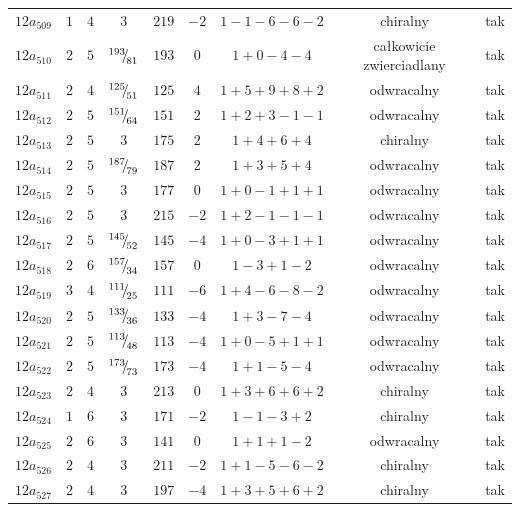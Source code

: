 \begin{longtable}{ccccccccc}
$12a_{509}$ & $1$ & $4$ & $3$ & $219$ & $-2$ & $1-1-6-6-2$ & chiralny & tak \\
$12a_{510}$ & $2$ & $5$ & ${}^{193}{\mskip -5mu/\mskip -3mu}_{81}$ & $193$ & $0$ & $1+0-4-4$ & całkowicie zwierciadlany & tak \\
$12a_{511}$ & $2$ & $4$ & ${}^{125}{\mskip -5mu/\mskip -3mu}_{51}$ & $125$ & $4$ & $1+5+9+8+2$ & odwracalny & tak \\
$12a_{512}$ & $2$ & $5$ & ${}^{151}{\mskip -5mu/\mskip -3mu}_{64}$ & $151$ & $2$ & $1+2+3-1-1$ & odwracalny & tak \\
$12a_{513}$ & $2$ & $5$ & $3$ & $175$ & $2$ & $1+4+6+4$ & chiralny & tak \\
$12a_{514}$ & $2$ & $5$ & ${}^{187}{\mskip -5mu/\mskip -3mu}_{79}$ & $187$ & $2$ & $1+3+5+4$ & odwracalny & tak \\
$12a_{515}$ & $2$ & $5$ & $3$ & $177$ & $0$ & $1+0-1+1+1$ & odwracalny & tak \\
$12a_{516}$ & $2$ & $5$ & $3$ & $215$ & $-2$ & $1+2-1-1-1$ & odwracalny & tak \\
$12a_{517}$ & $2$ & $5$ & ${}^{145}{\mskip -5mu/\mskip -3mu}_{52}$ & $145$ & $-4$ & $1+0-3+1+1$ & odwracalny & tak \\
$12a_{518}$ & $2$ & $6$ & ${}^{157}{\mskip -5mu/\mskip -3mu}_{34}$ & $157$ & $0$ & $1-3+1-2$ & odwracalny & tak \\
$12a_{519}$ & $3$ & $4$ & ${}^{111}{\mskip -5mu/\mskip -3mu}_{25}$ & $111$ & $-6$ & $1+4-6-8-2$ & odwracalny & tak \\
$12a_{520}$ & $2$ & $5$ & ${}^{133}{\mskip -5mu/\mskip -3mu}_{36}$ & $133$ & $-4$ & $1+3-7-4$ & odwracalny & tak \\
$12a_{521}$ & $2$ & $5$ & ${}^{113}{\mskip -5mu/\mskip -3mu}_{48}$ & $113$ & $-4$ & $1+0-5+1+1$ & odwracalny & tak \\
$12a_{522}$ & $2$ & $5$ & ${}^{173}{\mskip -5mu/\mskip -3mu}_{73}$ & $173$ & $-4$ & $1+1-5-4$ & odwracalny & tak \\
$12a_{523}$ & $2$ & $4$ & $3$ & $213$ & $0$ & $1+3+6+6+2$ & chiralny & tak \\
$12a_{524}$ & $1$ & $6$ & $3$ & $171$ & $-2$ & $1-1-3+2$ & chiralny & tak \\
$12a_{525}$ & $2$ & $6$ & $3$ & $141$ & $0$ & $1+1+1-2$ & odwracalny & tak \\
$12a_{526}$ & $2$ & $4$ & $3$ & $211$ & $-2$ & $1+1-5-6-2$ & chiralny & tak \\
$12a_{527}$ & $2$ & $4$ & $3$ & $197$ & $-4$ & $1+3+5+6+2$ & chiralny & tak \\

\end{longtable}
